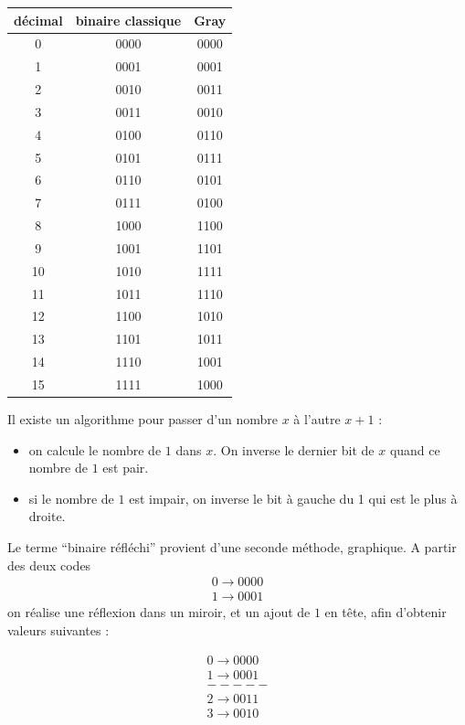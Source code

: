 \begin{center}
\begin{tabular}{|c|c|c|}
\hline
décimal & binaire classique & Gray \\
\hline
 0 & 0000 & 0000 \\
 1 & 0001 & 0001 \\
 2 & 0010 & 0011 \\
 3 & 0011 & 0010 \\
 4 & 0100 & 0110 \\
 5 & 0101 & 0111 \\
 6 & 0110 & 0101 \\
 7 & 0111 & 0100 \\
 8 & 1000 & 1100 \\
 9 & 1001 & 1101 \\
10 & 1010 & 1111 \\
11 & 1011 & 1110 \\
12 & 1100 & 1010 \\
13 & 1101 & 1011 \\
14 & 1110 & 1001 \\
15 & 1111 & 1000 \\
\hline
\end{tabular}
\end{center}

Il existe un algorithme pour passer d'un nombre $x$ à l'autre $x+1$ :
\begin{itemize}
\item on calcule le nombre de $1$ dans $x$. On inverse le dernier bit de $x$ quand ce nombre de $1$ est pair.
\item si le nombre de $1$ est impair, on inverse le bit à gauche du 1 qui est le plus à droite.
\end{itemize}

Le terme ``binaire réfléchi'' provient d'une seconde méthode, graphique. A partir des deux codes
\begin{align*}
0 \rightarrow 0000 \\
1 \rightarrow 0001
\end{align*}
on réalise une réflexion dans un miroir, et un ajout de $1$ en tête, afin d'obtenir valeurs suivantes :

\begin{align*}
0 \rightarrow 0000 \\
1 \rightarrow 0001 \\
----- \\
2 \rightarrow 0011 \\
3 \rightarrow 0010 \\
\end{align*}

